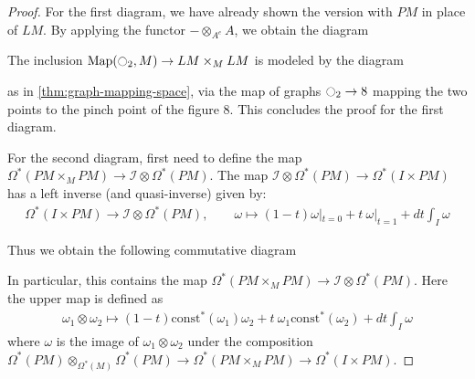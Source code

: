 \documentclass{scrartcl}
\theoremstyle{plain}
\theoremstyle{definition}
\DeclareMathOperator{\Map}{Map}
\newcommand{\blank}{-}
\begin{document}
\begin{proof}
    For the first diagram, we have already shown the version with $PM$ in place of $LM$. By applying the functor $\blank \otimes_{A^e} A$, we obtain the diagram
    \begin{center}
    \end{center}
    The inclusion $\Map(\ocircle_2, M)\to LM\times_M LM$ is modeled by the diagram
    \begin{center}
    \end{center}
    as in \ref{thm:graph-mapping-space}, via the map of graphs $\ocircle_2\to 8$ mapping the two points to the pinch point of the figure $8$. This concludes the proof for the first diagram.

    
    For the second diagram, first need to define the map $\Omega^*(PM\times_M PM) \to \mathcal I \otimes\Omega^*(PM)$. The map $\mathcal I\otimes\Omega^*(PM)\to \Omega^*(I\times PM)$ has a left inverse (and quasi-inverse) given by: 
    \begin{align*}
        \Omega^*(I\times PM) \to \mathcal I \otimes \Omega^*(PM),\qquad\omega\mapsto (1-t)\omega|_{t=0} + t\ \omega|_{t=1} + dt \int_I \omega
    \end{align*}

    Thus we obtain the following commutative diagram
    \begin{center}
    \end{center}
    In particular, this contains the map $\Omega^*(PM\times_M PM) \to \mathcal I \otimes\Omega^*(PM)$. Here the upper map is defined as
    \begin{align*}
        \omega_1\otimes \omega_2 \mapsto (1-t) \mathrm{const}^*(\omega_1)\omega_2 + t\ \omega_1 \mathrm{const}^*(\omega_2) + dt \int_I \omega
    \end{align*}
    where $\omega$ is the image of $\omega_1\otimes\omega_2$ under the composition $\Omega^*(PM)\otimes_{\Omega^*(M)}\Omega^*(PM) \to \Omega^*(PM\times_M PM) \to \Omega^*(I\times PM)$.




\end{proof}
\end{document}
